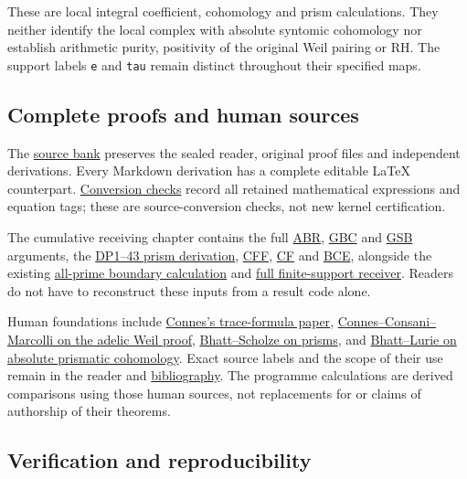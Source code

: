\documentclass[
]{article}
\begin{document}
These are local integral coefficient, cohomology and prism calculations.
They neither identify the local complex with absolute syntomic
cohomology nor establish arithmetic purity, positivity of the original
Weil pairing or RH. The support labels \texttt{e} and \texttt{tau}
remain distinct throughout their specified maps.

\subsection{Complete proofs and human
sources}\label{complete-proofs-and-human-sources}

The \href{collision_boundary/original_sources/}{source bank} preserves
the sealed reader, original proof files and independent derivations.
Every Markdown derivation has a complete editable LaTeX counterpart.
\href{LATEX_CONVERSION.json}{Conversion checks} record all retained
mathematical expressions and equation tags; these are source-conversion
checks, not new kernel certification.

The cumulative receiving chapter contains the full
\href{collision_boundary/ABR.tex}{ABR},
\href{collision_boundary/GBC.tex}{GBC} and
\href{collision_boundary/GSB.tex}{GSB} arguments, the
\href{collision_boundary/DP.tex}{DP1--43 prism derivation},
\href{collision_boundary/CFF.tex}{CFF},
\href{collision_boundary/CF.tex}{CF} and
\href{collision_boundary/BCE.tex}{BCE}, alongside the existing
\href{45_boundary_tensor_weights.tex}{all-prime boundary calculation}
and \href{15_full_finite_support_recollement.tex}{full finite-support
receiver}. Readers do not have to reconstruct these inputs from a result
code alone.

Human foundations include
\href{https://arxiv.org/abs/math/9811068v1}{Connes's trace-formula
paper},
\href{https://arxiv.org/abs/math/0703392v1}{Connes--Consani--Marcolli on
the adelic Weil proof},
\href{https://arxiv.org/abs/1905.08229v4}{Bhatt--Scholze on prisms}, and
\href{https://arxiv.org/abs/2201.06120v1}{Bhatt--Lurie on absolute
prismatic cohomology}. Exact source labels and the scope of their use
remain in the reader and
\href{collision_boundary/bibliography.tex}{bibliography}. The programme
calculations are derived comparisons using those human sources, not
replacements for or claims of authorship of their theorems.

\subsection{Verification and
reproducibility}\label{verification-and-reproducibility}
\end{document}

